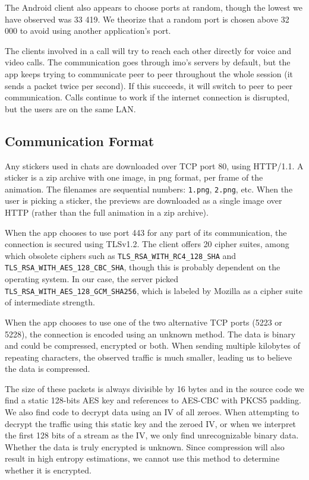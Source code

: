 \documentclass[conference]{IEEEtran}
\begin{document}
The Android client also appears to choose ports at random, though the lowest we
have observed was 33 419. We theorize that a random port is chosen above 32 000
to avoid using another application's port.

The clients involved in a call will try to reach each other directly for voice
and video calls. The communication goes through imo's servers by default, but
the app keeps trying to communicate peer to peer throughout the whole session
(it sends a packet twice per second). If this succeeds, it will switch to peer
to peer communication. Calls continue to work if the internet connection is
disrupted, but the users are on the same LAN.


\subsection{Communication Format}

Any stickers used in chats are downloaded over TCP port 80, using HTTP/1.1. A
sticker is a zip archive with one image, in png format, per frame of the
animation. The filenames are sequential numbers: \texttt{1.png}, \texttt{2.png},
etc. When the user is picking a sticker, the previews are downloaded as a single
image over HTTP (rather than the full animation in a zip archive).

When the app chooses to use port 443 for any part of its communication, the
connection is secured using TLSv1.2. The client offers 20 cipher suites, among
which obsolete ciphers such as \texttt{TLS\_RSA\_WITH\_RC4\_128\_SHA} and
\texttt{TLS\_RSA\_WITH\_AES\_128\_CBC\_SHA}, though this is probably dependent
on the operating system. In our case, the server picked
\texttt{TLS\_RSA\_WITH\_AES\_128\_GCM\_SHA256}, which is labeled by Mozilla as a
cipher suite of intermediate strength\cite{moz-tls}.

When the app chooses to use one of the two alternative TCP ports (5223 or
5228), the connection is encoded using an unknown method. The data is binary
and could be compressed, encrypted or both. When sending multiple kilobytes of
repeating characters, the observed traffic is much smaller, leading us to
believe the data is compressed.

The size of these packets is always divisible by 16 bytes and in the source
code we find a static 128-bits AES key and references to AES-CBC with PKCS5
padding. We also find code to decrypt data using an IV of all zeroes. When
attempting to decrypt the traffic using this static key and the zeroed IV, or
when we interpret the first 128 bits of a stream as the IV, we only find
unrecognizable binary data. Whether the data is truly encrypted is unknown.
Since compression will also result in high entropy estimations, we cannot use
this method to determine whether it is encrypted.
\end{document}
